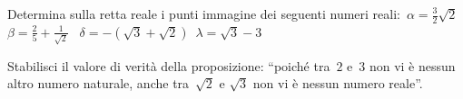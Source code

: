 \begin{comment}
\begin{esercizio}
 \label{ese:D.13}
Assegnata la funzione lineare~$f:y=m\cdot x+q$, essendo una funzione
iniettiva la sua inversa è:\dotfill
\end{esercizio}

\begin{esercizio}
 \label{ese:D.14}
Date le funzioni~$f(x)=2x+1$ e~$g(x)=3x+2$ che hanno per dominio
rispettivamente~$A=\left\{x\in \insZ/-2\le x\le~2\right\}$,
$B=\left\{x\in \insZ\text{/}-1\le x\le~3\right\}$
Scrivi le espressioni analitiche delle funzioni~$f\circ g$ e~$g\circ f$
\end{esercizio}


\end{comment}

\begin{esercizio}
\label{ese:D.15}
Determina sulla retta reale i punti immagine dei seguenti numeri reali:~$\alpha 
=\frac{3}{2}\sqrt{2}$\, $\beta =\frac{2}{5}+\frac{1}{\sqrt{2}}$
\, $\delta =-\left(\sqrt{3}+\sqrt{2}\right)$\, $\lambda =\sqrt{3}-3$
\end{esercizio}


\begin{esercizio}
\label{ese:D.17}
Stabilisci il valore di verità della proposizione: ``poiché tra~$2$ e~$3$ non vi 
è nessun altro numero naturale, anche tra~$\sqrt{2}$ e
$\sqrt{3}$ non vi è nessun numero reale''.
\end{esercizio}



